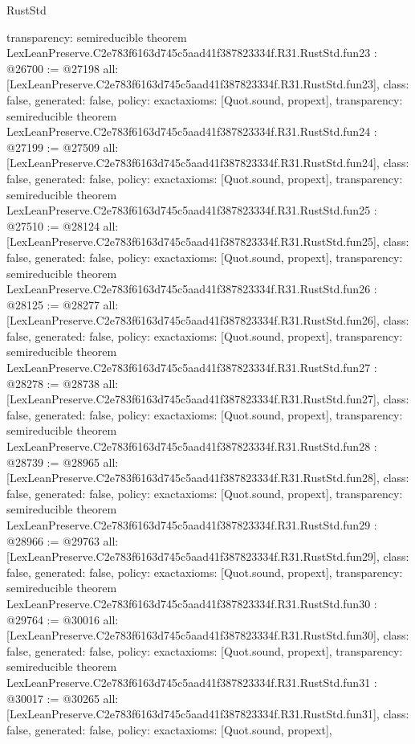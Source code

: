 \begin{lexlean}{RustStd}
\begin{coremodule}
{  transparency: semireducible
}
theorem LexLeanPreserve.C2e783f6163d745c5aad41f387823334f.R31.RustStd.fun23 : @26700 := @27198 {
  all: [LexLeanPreserve.C2e783f6163d745c5aad41f387823334f.R31.RustStd.fun23],
  class: false,
  generated: false,
  policy: exact{axioms: [Quot.sound, propext]},
  transparency: semireducible
}
theorem LexLeanPreserve.C2e783f6163d745c5aad41f387823334f.R31.RustStd.fun24 : @27199 := @27509 {
  all: [LexLeanPreserve.C2e783f6163d745c5aad41f387823334f.R31.RustStd.fun24],
  class: false,
  generated: false,
  policy: exact{axioms: [Quot.sound, propext]},
  transparency: semireducible
}
theorem LexLeanPreserve.C2e783f6163d745c5aad41f387823334f.R31.RustStd.fun25 : @27510 := @28124 {
  all: [LexLeanPreserve.C2e783f6163d745c5aad41f387823334f.R31.RustStd.fun25],
  class: false,
  generated: false,
  policy: exact{axioms: [Quot.sound, propext]},
  transparency: semireducible
}
theorem LexLeanPreserve.C2e783f6163d745c5aad41f387823334f.R31.RustStd.fun26 : @28125 := @28277 {
  all: [LexLeanPreserve.C2e783f6163d745c5aad41f387823334f.R31.RustStd.fun26],
  class: false,
  generated: false,
  policy: exact{axioms: [Quot.sound, propext]},
  transparency: semireducible
}
theorem LexLeanPreserve.C2e783f6163d745c5aad41f387823334f.R31.RustStd.fun27 : @28278 := @28738 {
  all: [LexLeanPreserve.C2e783f6163d745c5aad41f387823334f.R31.RustStd.fun27],
  class: false,
  generated: false,
  policy: exact{axioms: [Quot.sound, propext]},
  transparency: semireducible
}
theorem LexLeanPreserve.C2e783f6163d745c5aad41f387823334f.R31.RustStd.fun28 : @28739 := @28965 {
  all: [LexLeanPreserve.C2e783f6163d745c5aad41f387823334f.R31.RustStd.fun28],
  class: false,
  generated: false,
  policy: exact{axioms: [Quot.sound, propext]},
  transparency: semireducible
}
theorem LexLeanPreserve.C2e783f6163d745c5aad41f387823334f.R31.RustStd.fun29 : @28966 := @29763 {
  all: [LexLeanPreserve.C2e783f6163d745c5aad41f387823334f.R31.RustStd.fun29],
  class: false,
  generated: false,
  policy: exact{axioms: [Quot.sound, propext]},
  transparency: semireducible
}
theorem LexLeanPreserve.C2e783f6163d745c5aad41f387823334f.R31.RustStd.fun30 : @29764 := @30016 {
  all: [LexLeanPreserve.C2e783f6163d745c5aad41f387823334f.R31.RustStd.fun30],
  class: false,
  generated: false,
  policy: exact{axioms: [Quot.sound, propext]},
  transparency: semireducible
}
theorem LexLeanPreserve.C2e783f6163d745c5aad41f387823334f.R31.RustStd.fun31 : @30017 := @30265 {
  all: [LexLeanPreserve.C2e783f6163d745c5aad41f387823334f.R31.RustStd.fun31],
  class: false,
  generated: false,
  policy: exact{axioms: [Quot.sound, propext]},
}
\end{coremodule}
\end{lexlean}
